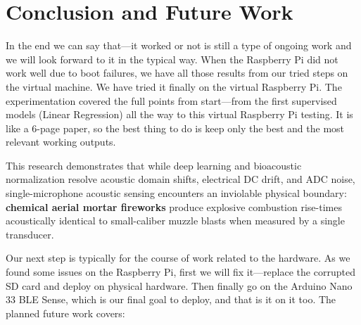\documentclass[conference]{IEEEtran}
\begin{document}
\section{Conclusion and Future Work}
\label{sec:conclusion}

In the end we can say that---it worked or not is still a type of ongoing work and we will look forward to it in the typical way. When the Raspberry Pi did not work well due to boot failures, we have all those results from our tried steps on the virtual machine. We have tried it finally on the virtual Raspberry Pi. The experimentation covered the full points from start---from the first supervised models (Linear Regression) all the way to this virtual Raspberry Pi testing. It is like a 6-page paper, so the best thing to do is keep only the best and the most relevant working outputs.

This research demonstrates that while deep learning and bioacoustic normalization resolve acoustic domain shifts, electrical DC drift, and ADC noise, single-microphone acoustic sensing encounters an inviolable physical boundary: \textbf{chemical aerial mortar fireworks} produce explosive combustion rise-times acoustically identical to small-caliber muzzle blasts when measured by a single transducer.

Our next step is typically for the course of work related to the hardware. As we found some issues on the Raspberry Pi, first we will fix it---replace the corrupted SD card and deploy on physical hardware. Then finally go on the Arduino Nano 33 BLE Sense, which is our final goal to deploy, and that is it on it too. The planned future work covers:
\end{document}
